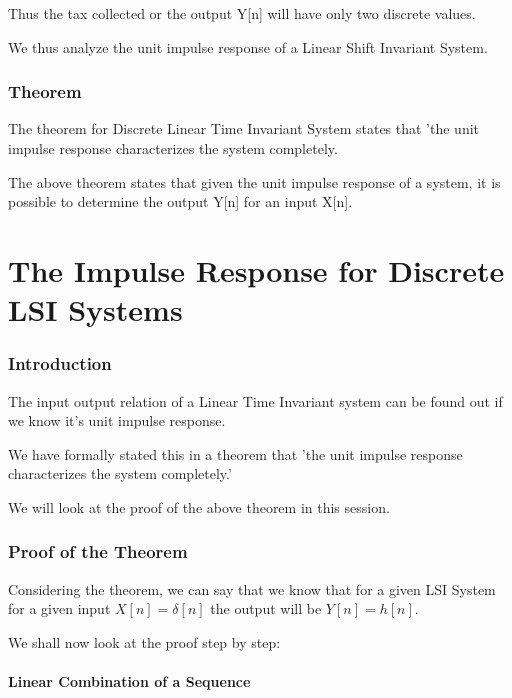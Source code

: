 Thus the tax collected or the output Y[n] will have only two discrete values. 

We thus analyze the unit impulse response of a Linear Shift Invariant System. 



\subsection{Theorem}
The theorem for Discrete Linear Time Invariant System states that 'the unit impulse response characterizes the system completely.

The above theorem states that given the unit impulse response of a system, it is possible to determine the output Y[n] for an input X[n].
 

\pagebreak

\chapter{The Impulse Response for Discrete LSI Systems}

\setcounter{section}{0}

\subsection{Introduction}
The input output relation of a Linear Time Invariant system can be found out if we know it's unit impulse response. 

We have formally stated this in a theorem that 'the unit impulse response characterizes the system completely.' 

We will look at the proof of the above theorem in this session.

\subsection{Proof of the Theorem}
Considering the theorem, we can say that we know that for a given LSI System for a given input $ X[n]=\delta[n]$ the output will be $Y[n]=h[n]$.

We shall now look at the proof step by step:


\subsubsection{Linear Combination of a Sequence}
Consider an input sequence

$$X[n]= [3, 2, -4, 7]$$
Consider 2 as the sample at the origin.


